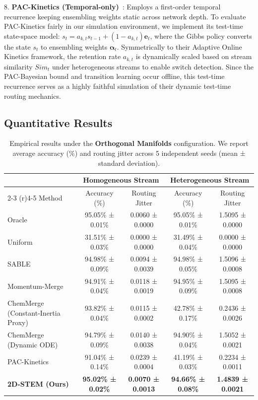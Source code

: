 8. \textbf{PAC-Kinetics (Temporal-only)}~\cite{pac_kinetics}: Employs a first-order temporal recurrence keeping ensembling weights static across network depth. To evaluate PAC-Kinetics fairly in our simulation environment, we implement its test-time state-space model: $s_t = a_{k, t} s_{t-1} + (1 - a_{k, t}) \mathbf{e}_t$, where the Gibbs policy converts the state $s_t$ to ensembling weights $\boldsymbol{\alpha}_t$. Symmetrically to their Adaptive Online Kinetics framework, the retention rate $a_{k, t}$ is dynamically scaled based on stream similarity $Sim_t$ under heterogeneous streams to enable switch detection. Since the PAC-Bayesian bound and transition learning occur offline, this test-time recurrence serves as a highly faithful simulation of their dynamic test-time routing mechanics.

\subsection{Quantitative Results}

\begin{table}[t]
\caption{Empirical results under the \textbf{Orthogonal Manifolds} configuration. We report average accuracy (\%) and routing jitter across 5 independent seeds (mean ± standard deviation).}
\label{tab:orthogonal_results}
\vskip 0.15in
\begin{center}
\begin{small}
\begin{sc}
\begin{tabular}{lcccc}
\toprule
& \multicolumn{2}{c}{Homogeneous Stream} & \multicolumn{2}{c}{Heterogeneous Stream} \\
\cmidrule(r){2-3} \cmidrule(r){4-5}
Method & Accuracy (\%) & Routing Jitter & Accuracy (\%) & Routing Jitter \\
\midrule
Oracle & 95.05\% ± 0.01\% & 0.0060 ± 0.0000 & 95.05\% ± 0.01\% & 1.5095 ± 0.0000 \\
Uniform & 31.51\% ± 0.03\% & 0.0000 ± 0.0000 & 31.49\% ± 0.04\% & 0.0000 ± 0.0000 \\
\midrule
SABLE & 94.98\% ± 0.09\% & 0.0094 ± 0.0039 & 94.98\% ± 0.05\% & 1.5096 ± 0.0008 \\
Momentum-Merge & 94.91\% ± 0.04\% & 0.0118 ± 0.0019 & 94.95\% ± 0.09\% & 1.5095 ± 0.0008 \\
ChemMerge (Constant-Inertia Proxy) & 93.82\% ± 0.04\% & 0.0115 ± 0.0002 & 42.78\% ± 0.17\% & 0.2436 ± 0.0026 \\
ChemMerge (Dynamic ODE) & 94.79\% ± 0.09\% & 0.0140 ± 0.0038 & 94.90\% ± 0.04\% & 1.5052 ± 0.0021 \\
PAC-Kinetics & 91.04\% ± 0.14\% & 0.0239 ± 0.0004 & 41.19\% ± 0.03\% & 0.2234 ± 0.0011 \\
\midrule
\textbf{2D-STEM (Ours)} & \textbf{95.02\% ± 0.02\%} & \textbf{0.0070 ± 0.0013} & \textbf{94.66\% ± 0.08\%} & \textbf{1.4839 ± 0.0021} \\
\bottomrule
\end{tabular}
\end{sc}
\end{small}
\end{center}
\vskip -0.1in
\end{table}


